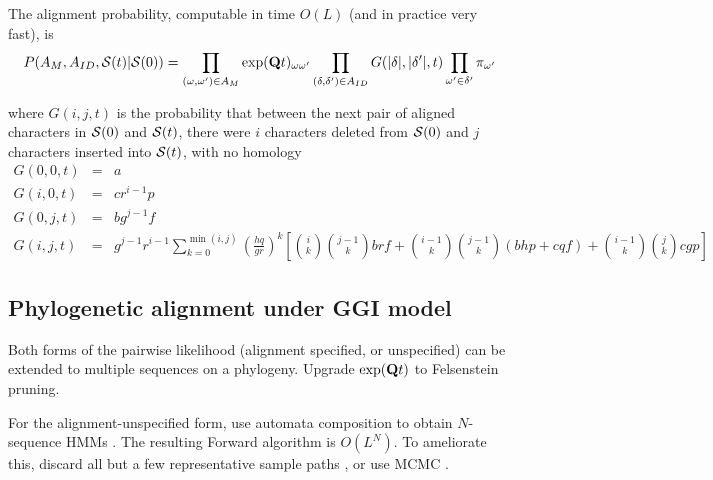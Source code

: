 \documentclass{article}
\begin{document}
The alignment probability, computable in time $O(L)$ (and in practice very fast), is
\[
P(A_M,A_{ID},{\cal S}(t)|{\cal S}(0)) =
\prod_{(\omega,\omega') \in A_M} \exp({\bf Q}t)_{\omega \omega'}
\prod_{(\delta,\delta') \in A_{ID}} G(|\delta|,|\delta'|,t)
\prod_{\omega'\in \delta'} \pi_{\omega'}
\]

where $G(i,j,t)$ is the probability that between the next pair of aligned characters in ${\cal S}(0)$ and ${\cal S}(t)$,
there were $i$ characters deleted from ${\cal S}(0)$ 
and $j$ characters inserted into ${\cal S}(t)$,
with no homology
\begin{eqnarray*}
G(0,0,t) & = & a \\
G(i,0,t) & = & cr^{i-1}p \\
G(0,j,t) & = & bg^{j-1}f \\
G(i,j,t) & = &
g^{j-1} r^{i-1}
\sum_{k=0}^{\min(i,j)}
\left(\frac{hq}{gr}\right)^k
\left[
\binom{i}{k} \binom{j-1}{k} brf
+ \binom{i-1}{k} \binom{j-1}{k} (bhp+cqf)
+ \binom{i-1}{k} \binom{j}{k} cgp
\right]
\end{eqnarray*}

\subsection{Phylogenetic alignment under GGI model}

Both forms of the pairwise likelihood (alignment specified, or unspecified) can be extended to multiple sequences on a phylogeny.
Upgrade $\exp({\bf Q}t)$ to Felsenstein pruning. %

For the alignment-unspecified form, use automata composition to obtain $N$-sequence HMMs \cite{SilvestreRyanEtAl2020}.
The resulting Forward algorithm is $O(L^N)$.
To ameliorate this, discard all but a few representative sample paths \cite{WestessonEtAl2012},
or use MCMC \cite{RedelingsSuchard2007}.



\end{document}
